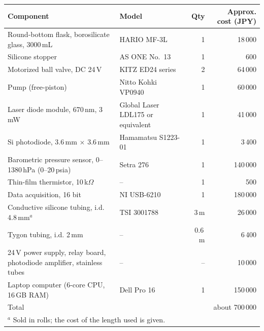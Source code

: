 \begin{tabular}{llrr}
\toprule
Component & Model & Qty & Approx. cost (JPY) \\
\midrule
Round-bottom flask, borosilicate glass, 3000\,mL & HARIO MF-3L & 1 & 18\,000 \\
Silicone stopper & AS ONE No.~13 & 1 & 600 \\
Motorized ball valve, DC 24\,V & KITZ ED24 series & 2 & 64\,000 \\
Pump (free-piston) & Nitto Kohki VP0940 & 1 & 60\,000 \\
Laser diode module, 670\,nm, 3\,mW & Global Laser LDL175 or equivalent & 1 & 41\,000 \\
Si photodiode, 3.6\,mm $\times$ 3.6\,mm & Hamamatsu S1223-01 & 1 & 3\,400 \\
Barometric pressure sensor, 0--1380\,hPa (0--20\,psia) & Setra 276 & 1 & 140\,000 \\
Thin-film thermistor, 10\,k$\Omega$ & -- & 1 & 500 \\
Data acquisition, 16 bit & NI USB-6210 & 1 & 180\,000 \\
Conductive silicone tubing, i.d. 4.8\,mm$^{a}$ & TSI 3001788 & 3\,m & 26\,000 \\
Tygon tubing, i.d. 2\,mm & -- & 0.6\,m & 6\,400 \\
24\,V power supply, relay board, photodiode amplifier, stainless tubes & -- & -- & 10\,000 \\
Laptop computer (6-core CPU, 16\,GB RAM) & Dell Pro 16 & 1 & 150\,000 \\
\midrule
Total & & & about 700\,000 \\
\bottomrule
\multicolumn{4}{l}{\footnotesize $^{a}$ Sold in rolls; the cost of the length used is given.}\\
\end{tabular}
